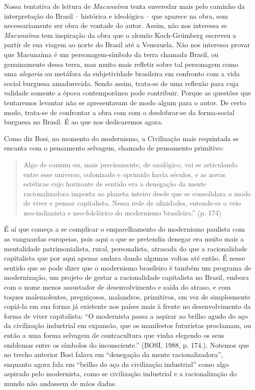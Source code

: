 Nossa tentativa de leitura de \emph{Macunaíma} tenta enveredar mais pelo
caminho da interpretação do Brasil -- histórica e ideológica -- que
aparece na obra, sem necessariamente ser obra de vontade do autor.
Assim, não nos interessa se \emph{Macunaíma} tem inspiração da obra que
o alemão Koch-Grümberg escreveu a partir de sua viagem ao norte do
Brasil até a Venezuela. Não nos interessa provar que Macunaíma é um
personagem-símbolo da terra chamada Brasil, ou genuinamente dessa terra,
mas muito mais refletir sobre tal personagem como uma \emph{alegoria} ou
metáfora da subjetividade brasileira em confronto com a vida social
burguesa amadurecida. Sendo assim, trata-se de uma reflexão para cuja
validade somente a época contemporânea pode contribuir. Porque as
questões que tentaremos levantar não se apresentavam de modo algum para
o autor. De certo modo, trata-se de confrontar a obra com com o
desdobrar-se da forma-social burguesa no Brasil. É ao que nos
dedicaremos agora.

Como diz Bosi, no momento do modernismo, a Civilização mais requintada
se encanta com o pensamento selvagem, chamado de pensamento primitivo:

\begin{quote}
Algo de comum ou, mais precisamente, de analógico, vai se articulando
entre esse universo, colonizado e oprimido havia séculos, e as novas
estéticas cujo horizonte de sentido era a denegação da mente
racionalizadora imposta ao planeta inteiro desde que se consolidara o
modo de viver e pensar capitalista. Nessa rede de afinidades, entende-se
o veio neo-indianista e neo-folclórico do modernismo brasileiro.'' (p.
174)
\end{quote}

É aí que começa a se complicar o emparelhamento do modernismo paulista
com as vanguardas europeias, pois aqui o que se pretendia denegar era
muito mais a mentalidade patrimonialista, rural, personalista, atrasada
do que a racionalidade capitalista que por aqui apenas andara dando
algumas voltas até então. É nesse sentido que se pode dizer que o
modernismo brasileiro é também um programa de modernização, um projeto
de gestar a racionalidade capitalista no Brasil, embora com o nome menos
assustador de desenvolvimento e saída do atraso, e com toques
malemolentes, preguiçosos, malandros, primitivos, em vez de simplesmente
copiá-la em sua forma já existente nos países mais à frente no
desenvolvimento da forma de viver capitalista: ``O modernista passa a
aspirar ao brilho agudo do aço da civilização industrial em expansão,
que os manifestos futuristas proclamam, ou então a uma forma selvagem de
contracultura que vinha elegendo os seus emblemas entre os símbolos do
inconsciente.'' (BOSI, 1988, p. 174.). Notemos que no trecho anterior
Bosi falava em ``denegação da mente racionalizadora'', enquanto agora
fala em ``brilho do aço da civilização industrial'' como algo aspirado
pelo modernista, como se civilização industrial e a racionalização do
mundo não andassem de mãos dadas.


